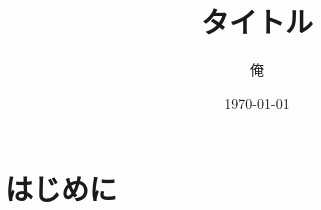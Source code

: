 \documentclass[a4j,12pt]{jarticle}
\title{タイトル}
\author{俺}
\date{\today}
\begin{document}
\maketitle

\section{はじめに}
 
\end{document}
